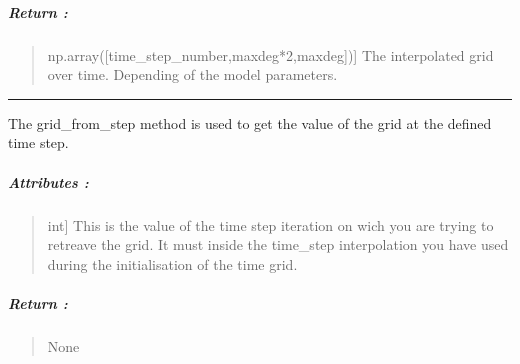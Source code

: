 \documentclass[letterpaper,10pt,english]{sphinxmanual}
\begin{document}
\begin{fulllineitems}
\begin{quote}
\begin{description}
\end{description}
\end{quote}


\subparagraph{Return :}
\label{\detokenize{GRID_doc/TIME_GRID_doc:id5}}\begin{quote}
\begin{description}
\sphinxlineitem{grid\_interpolated}{[}np.array({[}time\_step\_number,maxdeg*2,maxdeg{]}){]}
\sphinxAtStartPar
The interpolated grid over time. Depending of the model parameters.

\end{description}
\end{quote}

\end{fulllineitems}



\bigskip\hrule\bigskip


\begin{fulllineitems}
\label{\detokenize{GRID_doc/TIME_GRID_doc:SL_C0de.grid.TIME_GRID.grid_from_step}}
\pysigstartsignatures
{}
\pysigstopsignatures
\sphinxAtStartPar
The \label{\detokenize{GRID_doc/TIME_GRID_doc:grid-from-step}}grid\_from\_step method is used to get the value of the grid at the defined time step.


\subparagraph{Attributes :}
\label{\detokenize{GRID_doc/TIME_GRID_doc:id6}}\begin{quote}
\begin{description}
\sphinxlineitem{t\_it}{[}int{]}
\sphinxAtStartPar
This is the value of the time step iteration on wich you are trying to retreave the grid. It must inside the time\_step interpolation you have used during the initialisation of the time grid.

\end{description}
\end{quote}


\subparagraph{Return :}
\label{\detokenize{GRID_doc/TIME_GRID_doc:id7}}\begin{quote}

\sphinxAtStartPar
None
\end{quote}

\end{fulllineitems}
\end{document}
